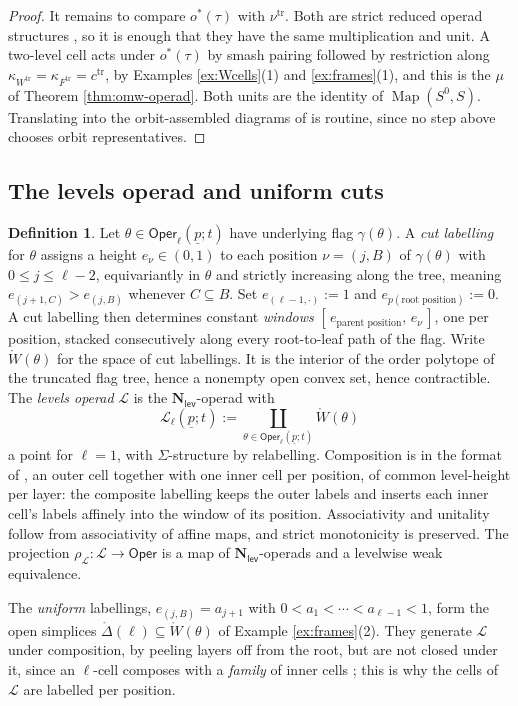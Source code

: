\documentclass[12pt]{amsart}
\theoremstyle{definition}
\newtheorem{definition}[subsection]{Definition}
\theoremstyle{remark}
\newcommand{\Oper}{\mathsf{Oper}}
\newcommand{\Map}{\operatorname{Map}}
\newcommand{\Nl}{\mathbf{N}_{\mathsf{lev}}}
\newcommand{\Lop}{\mathcal{L}}                   %
\begin{document}
\begin{proof}
It remains to compare $o^{*}(\tau)$ with $\nu^{\mathrm{tr}}$. Both are strict reduced operad structures \cite[Proposition 7.12]{Clark-1}, so it is enough that they have the same multiplication and unit. A two-level cell acts under $o^{*}(\tau)$ by smash pairing followed by restriction along $\kappa_{W^{\mathrm{tr}}} = \kappa_{F^{\mathrm{tr}}} = c^{\mathrm{tr}}$, by Examples \ref{ex:Wcells}(1) and \ref{ex:frames}(1), and this is the $\mu$ of Theorem \ref{thm:omw-operad}. Both units are the identity of $\Map(S^0,S)$. Translating into the orbit-assembled diagrams of \cite[Definition 6.32]{Clark-1} is routine, since no step above chooses orbit representatives.
\end{proof}

\subsection{The levels operad and uniform cuts}\label{sec:L-operad}

\begin{definition}\label{def:L}
Let $\theta\in \Oper_\ell(\underline{p};t)$ have underlying flag $\gamma(\theta)$. A \emph{cut labelling} for $\theta$ assigns a height $e_\nu\in(0,1)$ to each position $\nu = (j,B)$ of $\gamma(\theta)$ with $0\leq j\leq \ell-2$, equivariantly in $\theta$ and strictly increasing along the tree, meaning $e_{(j+1,C)} > e_{(j,B)}$ whenever $C\subseteq B$. Set $e_{(\ell-1,\cdot)} := 1$ and $e_{p(\text{root position})} := 0$. A cut labelling then determines constant \emph{windows} $[\,e_{\text{parent position}},\, e_\nu\,]$, one per position, stacked consecutively along every root-to-leaf path of the flag. Write $\mathring{W}(\theta)$ for the space of cut labellings. It is the interior of the order polytope of the truncated flag tree, hence a nonempty open convex set, hence contractible. The \emph{levels operad} $\Lop$ is the $\Nl$-operad with
\[ \Lop_\ell(\underline{p};t) := \coprod_{\theta\in\Oper_\ell(\underline{p};t)} \mathring{W}(\theta)\]
a point for $\ell = 1$, with $\Sigma$-structure by relabelling. Composition is in the format of \cite[\S 6]{Clark-1}, an outer cell together with one inner cell per position, of common level-height per layer: the composite labelling keeps the outer labels and inserts each inner cell's labels affinely into the window of its position. Associativity and unitality follow from associativity of affine maps, and strict monotonicity is preserved. The projection $\rho_\Lop\colon \Lop\to\Oper$ is a map of $\Nl$-operads and a levelwise weak equivalence.

The \emph{uniform} labellings, $e_{(j,B)} = a_{j+1}$ with $0 < a_1 < \cdots < a_{\ell-1} < 1$, form the open simplices $\mathring{\Delta}(\ell)\subseteq \mathring{W}(\theta)$ of Example \ref{ex:frames}(2). They generate $\Lop$ under composition, by peeling layers off from the root, but are not closed under it, since an $\ell$-cell composes with a \emph{family} of inner cells \cite[\S 6]{Clark-1}; this is why the cells of $\Lop$ are labelled per position.
\end{definition}
\end{document}
